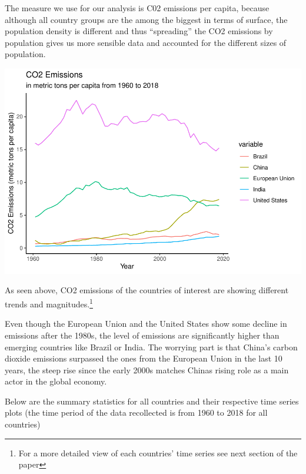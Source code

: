 \documentclass[
]{article}
\begin{document}
The measure we use for our analysis is C02 emissions per capita, because
although all country groups are the among the biggest in terms of
surface, the population density is different and thus ``spreading'' the
CO2 emissions by population gives us more sensible data and accounted
for the different sizes of population.

\includegraphics{tsa_files/figure-latex/unnamed-chunk-1-1.pdf}

As seen above, CO2 emissions of the countries of interest are showing
different trends and magnitudes.\footnote{For a more detailed view of
  each countries' time series see next section of the paper}

Even though the European Union and the United States show some decline
in emissions after the 1980s, the level of emissions are significantly
higher than emerging countries like Brazil or India. The worrying part
is that China's carbon dioxide emissions surpassed the ones from the
European Union in the last 10 years, the steep rise since the early
2000s matches Chinas rising role as a main actor in the global economy.

Below are the summary statistics for all countries and their respective
time series plots (the time period of the data recollected is from 1960
to 2018 for all countries)
\end{document}
